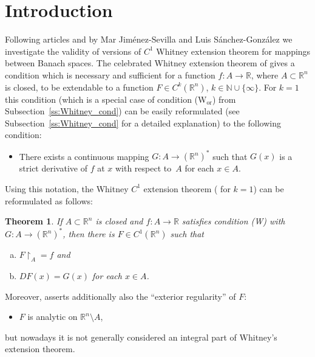 \documentclass[a4paper,twoside,10pt,reqno,draft]{amsart}
\newtheorem{theoremW}{Theorem}\renewcommand{\thetheoremW}{W}
\theoremstyle{definition}
\theoremstyle{remark}
\newcommand\N{{\mathbb N}}
\newcommand\R{{\mathbb R}}
\newcommand\restr[1]{\mathclose\restriction_{#1}}
\newcommand\cWor{(W$_{\mathrm{or}}$)}
\begin{document}
\section{Introduction}

Following articles \cite{JS1} and \cite{JS2} by Mar Jiménez-Sevilla and Luis Sánchez-González we investigate the validity of versions of $C^1$ Whitney extension theorem for mappings between Banach spaces.
The celebrated Whitney extension theorem of \cite{Wh1} gives a condition which is necessary and sufficient for a function $f\colon A\to\R$, where $A\subset\R^n$ is closed,
to be extendable to a function $F\in C^k(\R^n)$, $k\in\N\cup\{\infty\}$.
For $k=1$ this condition (which is a special case of condition {\cWor} from Subsection~\ref{ss:Whitney_cond}) can be easily reformulated (see Subsection~\ref{ss:Whitney_cond} for a detailed explanation) to the following condition:
\begin{itemize}
\item[(W)\ ]
There exists a continuous mapping $G\colon A\to(\R^n)^*$ such that $G(x)$ is a strict derivative of $f$ at $x$ with respect to~$A$ for each $x\in A$.
\end{itemize}

Using this notation, the Whitney $C^1$ extension theorem (\cite[Theorem I]{Wh1} for $k=1$) can be reformulated as follows:
\begin{theoremW}\label{t:Whitney}
If $A\subset\R^n$ is closed and $f\colon A\to\R$ satisfies condition (W) with $G\colon A\to(\R^n)^*$, then there is $F\in C^1(\R^n)$ such that
\begin{enumerate}[(a)]
\item $F\restr A=f$ and
\item $DF(x)=G(x)$ for each $x\in A$.
\end{enumerate}
\end{theoremW}
Moreover, \cite[Theorem I]{Wh1} asserts additionally also the ``exterior regularity'' of $F$:
\begin{itemize}
\item[\textbf{(ER)}] $F$ is analytic on $\R^n\setminus A$,
\end{itemize}
but nowadays it is not generally considered an integral part of Whitney's extension theorem.
\end{document}
